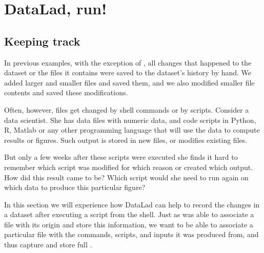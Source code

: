 \chapter{DataLad, run!}
\label{\detokenize{basics/basics-run:datalad-run}}\label{\detokenize{basics/basics-run:chapter-run}}\label{\detokenize{basics/basics-run:id1}}\label{\detokenize{basics/basics-run::doc}}

\sphinxstepscope

\ignorespaces 

\section{Keeping track}
\label{\detokenize{basics/101-108-run:keeping-track}}\label{\detokenize{basics/101-108-run:run}}\label{\detokenize{basics/101-108-run:index-0}}\label{\detokenize{basics/101-108-run::doc}}
\sphinxAtStartPar
In previous examples, with the exception of , all
changes that happened to the dataset or the files it contains were
saved to the dataset’s history by hand. We added larger and smaller
files and saved them, and we also modified smaller file contents and
saved these modifications.

\sphinxAtStartPar
Often, however, files get changed by shell commands
or by scripts.
Consider a data scientist.
She has data files with numeric data,
and code scripts in Python, R, Matlab or any other programming language
that will use the data to compute results or figures. Such output is
stored in new files, or modifies existing files.

\sphinxAtStartPar
But only a few weeks after these scripts were executed she finds it hard
to remember which script was modified for which reason or created which
output. How did this result came to be? Which script would she need
to run again on which data to produce this particular figure?

\sphinxAtStartPar
In this section we will experience how DataLad can help
to record the changes in a dataset after executing a script
from the shell. Just as  was able to associate
a file with its origin and store this information, we want to be
able to associate a particular file with the commands, scripts, and inputs
it was produced from, and thus capture and store full {\hyperref[\detokenize{glossary:term-provenance}]{}}.

